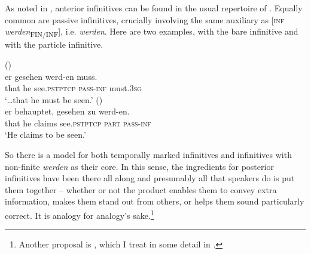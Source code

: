 \documentclass[output=paper,hidelinks]{langscibook}
\begin{document}
As noted in , anterior infinitives can be found in the usual repertoire of . Equally common are passive infinitives, crucially involving the same auxiliary as [\textsc{inf} \emph{werden}\textsubscript{FIN/INF}], i.e. \emph{werden}. Here are two examples,  with the bare infinitive and  with the particle infinitive.

\ea\label{ex:reiner:39}  () \\
	{er}	{gesehen}		{werd-en}	{muss.}\\
that	he	see.\textsc{pstptcp}		\textsc{pass}-\textsc{inf}	must.\textsc{3sg}\\
\glt ‘…that he must be seen.’
\ex\label{ex:reiner:40}  () \\
	{er}	{behauptet,}	{gesehen}	{zu}	{werd-en.}\\
 that	he	claims		see.\textsc{pstptcp}	\textsc{part}	\textsc{pass}-\textsc{inf}\\
\glt    ‘He claims to be seen.’ 
\z

So there is a model for both temporally marked infinitives and infinitives with non-finite \emph{werden} as their core. In this sense, the ingredients for posterior infinitives have been there all along and presumably all that speakers do is put them together – whether or not the product enables them to convey extra information, makes them stand out from others, or helps them sound particularly correct. It is analogy for analogy’s sake.\footnote{Another proposal is \citet{Reis1979,Reis2017}, which I treat in some detail in \citet{Reiner2018}.} 
\end{document}
